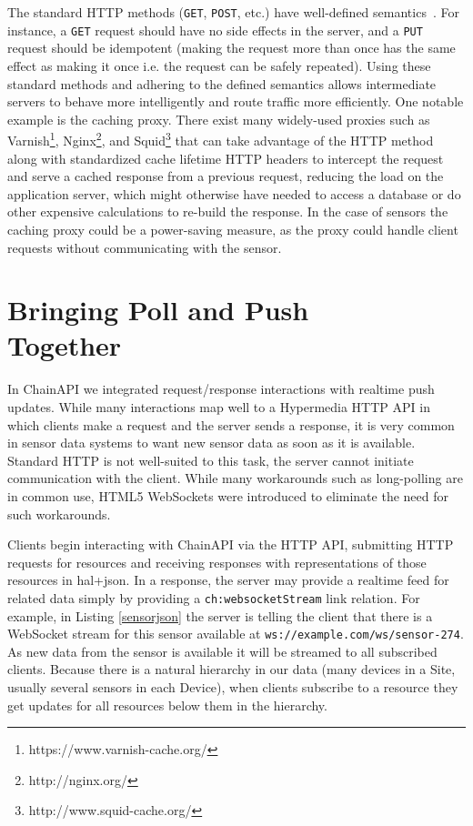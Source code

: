 \documentclass{acm_proc_article-sp}
\begin{document}
The standard HTTP methods (\texttt{GET}, \texttt{POST}, etc.) have well-defined
semantics~\cite{httpmethods}. For instance, a \texttt{GET} request should have
no side effects in the server, and a \texttt{PUT} request should be idempotent
(making the request more than once has the same effect as making it once i.e.
the request can be safely repeated). Using these standard methods and adhering
to the defined semantics allows intermediate servers to behave more
intelligently and route traffic more efficiently. One notable example is the
caching proxy. There exist many widely-used proxies such as
Varnish\footnote{https://www.varnish-cache.org/},
Nginx\footnote{http://nginx.org/}, and
Squid\footnote{http://www.squid-cache.org/} that can take advantage of the HTTP
method along with standardized cache lifetime HTTP headers to intercept the
request and serve a cached response from a previous request, reducing the load
on the application server, which might otherwise have needed to access a
database or do other expensive calculations to re-build the response. In the
case of sensors the caching proxy could be a power-saving measure, as the proxy
could handle client requests without communicating with the sensor.

\section{Bringing Poll and Push\\ Together}

In ChainAPI we integrated request/response interactions with realtime push
updates. While many interactions map well to a Hypermedia HTTP API in which
clients make a request and the server sends a response, it is very common in
sensor data systems to want new sensor data as soon as it is available.
Standard HTTP is not well-suited to this task, the server cannot initiate
communication with the client. While many workarounds such as long-polling are
in common use, HTML5 WebSockets were introduced to eliminate the need for such
workarounds.

Clients begin interacting with ChainAPI via the HTTP API, submitting HTTP
requests for resources and receiving responses with representations of those
resources in hal+json. In a response, the server may provide a realtime feed
for related data simply by providing a \texttt{ch:websocketStream} link
relation. For example, in Listing \ref{sensorjson} the server is telling the
client that there is a WebSocket stream for this sensor available at
\texttt{ws://example.com/ws/sensor-274}. As new data from the sensor is
available it will be streamed to all subscribed clients. Because there is a
natural hierarchy in our data (many devices in a Site, usually several sensors
in each Device), when clients subscribe to a resource they get updates for all
resources below them in the hierarchy.
\end{document}

